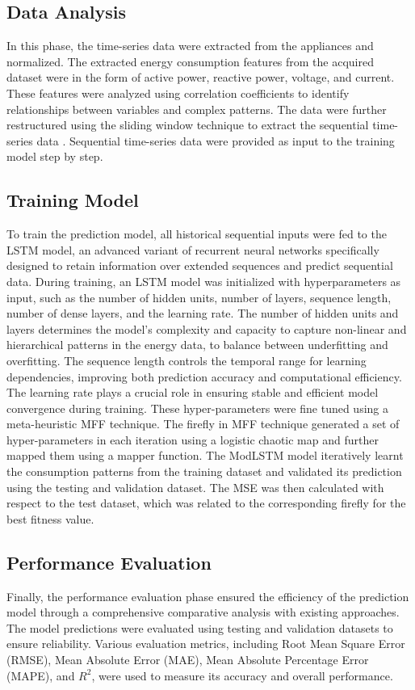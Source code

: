 \documentclass[journal]{IEEEtran}
\begin{document}
\subsection{Data Analysis}
In this phase, the time-series data were extracted from the appliances and normalized. The extracted energy consumption features from the acquired dataset were in the form of active power, reactive power, voltage, and current. These features were analyzed using correlation coefficients to identify relationships between variables and complex patterns.
The data were further restructured using the sliding window technique to extract the sequential time-series data \cite{Ref2}. Sequential time-series data were provided as input to the training model step by step.

\subsection{Training Model}
To train the prediction model, all historical sequential inputs were fed to the LSTM model, an advanced variant of recurrent neural networks specifically designed to retain information over extended sequences and predict sequential data. During training, an LSTM model was initialized with hyperparameters as input, such as the number of hidden units, number of layers, sequence length, number of dense layers, and the learning rate. The number of hidden units and layers determines the model's complexity and capacity to capture non-linear and hierarchical patterns in the energy data, to balance between underfitting and overfitting. The sequence length controls the temporal range for learning dependencies, improving both prediction accuracy and computational efficiency. The learning rate plays a crucial role in ensuring stable and efficient model convergence during training. These hyper-parameters were fine tuned using a meta-heuristic MFF technique. The firefly in MFF technique generated a set of hyper-parameters in each iteration using a logistic chaotic map and further mapped them using a mapper function. The ModLSTM model iteratively learnt the consumption patterns from the training dataset and validated its prediction using the testing and validation dataset. The MSE was then calculated with respect to the test dataset, which was related to the corresponding firefly for the best fitness value. 

\subsection{Performance Evaluation}
Finally, the performance evaluation phase ensured the efficiency of the prediction model through a comprehensive comparative analysis with existing approaches. The model predictions were evaluated using testing and validation datasets to ensure reliability. Various evaluation metrics, including Root Mean Square Error (RMSE), Mean Absolute Error (MAE), Mean Absolute Percentage Error (MAPE), and $R^2$, were used to measure its accuracy and overall performance.  
\end{document}
